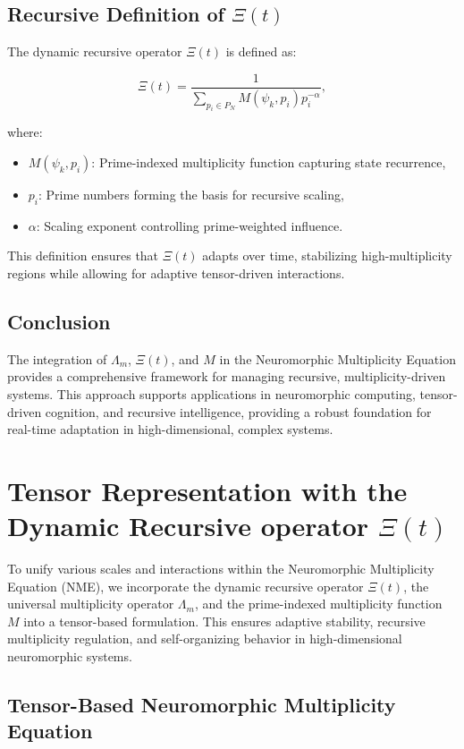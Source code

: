 \documentclass[12pt]{article}
\theoremstyle{plain}
\begin{document}
\subsection{Recursive Definition of \(\Xi(t)\)}

The dynamic recursive operator \(\Xi(t)\) is defined as:

\[
\Xi(t) = \frac{1}{\sum_{p_i \in P_N} M(\psi_k, p_i) p_i^{-\alpha}},
\]

where:
\begin{itemize}
    \item \( M(\psi_k, p_i) \): Prime-indexed multiplicity function capturing state recurrence,
    \item \( p_i \): Prime numbers forming the basis for recursive scaling,
    \item \( \alpha \): Scaling exponent controlling prime-weighted influence.
\end{itemize}

This definition ensures that \(\Xi(t)\) adapts over time, stabilizing high-multiplicity regions while allowing for adaptive tensor-driven interactions.

\subsection{Conclusion}

The integration of \(\Lambda_m\), \(\Xi(t)\), and \(M\) in the Neuromorphic Multiplicity Equation provides a comprehensive framework for managing recursive, multiplicity-driven systems. This approach supports applications in neuromorphic computing, tensor-driven cognition, and recursive intelligence, providing a robust foundation for real-time adaptation in high-dimensional, complex systems.

\section{Tensor Representation with the Dynamic Recursive operator \(\Xi(t)\)}


To unify various scales and interactions within the Neuromorphic Multiplicity Equation (NME), we incorporate the dynamic recursive operator \(\Xi(t)\), the universal multiplicity operator \(\Lambda_m\), and the prime-indexed multiplicity function \(M\) into a tensor-based formulation. This ensures adaptive stability, recursive multiplicity regulation, and self-organizing behavior in high-dimensional neuromorphic systems.


\subsection{Tensor-Based Neuromorphic Multiplicity Equation}
\end{document}
